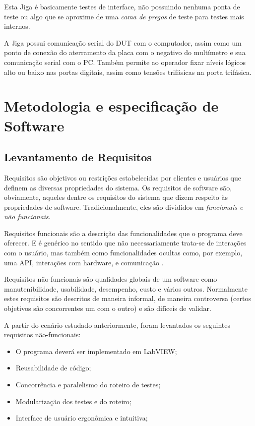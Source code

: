         Esta Jiga é basicamente testes de interface, não possuindo nenhuma ponta de teste ou algo que se aproxime de uma \emph{cama de pregos} de teste para testes mais internos.  
    
        A Jiga possui comunicação serial do DUT com o computador, assim como um ponto de conexão do aterramento da placa com o negativo do multímetro e sua comunicação serial com o PC. Também permite ao operador fixar níveis lógicos alto ou baixo nas portas digitais, assim como tensões trifásicas na porta trifásica.
    
    \section{Metodologia e especificação de Software} \label{metodologia}

    \subsection{Levantamento de Requisitos}
        Requisitos são objetivos ou restrições estabelecidas por clientes e usuários que definem as diversas propriedades do sistema. Os requisitos de software são, obviamente, aqueles dentre os requisitos do sistema que dizem respeito às propriedades de software. Tradicionalmente, eles são divididos em \textit{funcionais e não funcionais}.
        
        Requisitos funcionais são a descrição das funcionalidades que o programa deve oferecer. E é genérico no sentido que não necessariamente trata-se de interações com o usuário, mas também como funcionalidades ocultas como, por exemplo, uma API, interações com hardware, e comunicação \citep{bourque2014guide}.
        
        Requisitos não-funcionais são qualidades globais de um software como manutenibilidade, usabilidade, desempenho, custo e vários outros. Normalmente estes requisitos são descritos de maneira informal, de maneira controversa (certos objetivos são concorrentes um com o outro) e são difíceis de validar\citep{bourque2014guide}.
        
        A partir do cenário estudado anteriormente, foram levantados os seguintes requisitos não-funcionais:
        \begin{itemize}
            \item O programa deverá ser implementado em LabVIEW;
            \item Reusabilidade de código;
            \item Concorrência e paralelismo do roteiro de testes;
            \item Modularização dos testes e do roteiro;
            \item Interface de usuário ergonômica e intuitiva;
        \end{itemize}
        
